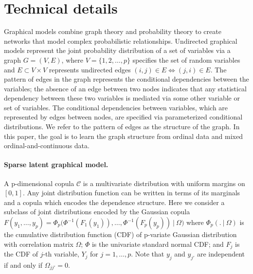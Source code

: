 \section{Technical details}
\label{chpter4:method}
Graphical models combine graph theory and probability theory to create networks that model complex probabilistic relationships. Undirected graphical models represent the joint probability distribution of a set of variables via a graph $G=(V,E)$, where $V = \{1, 2, \ldots, p\}$ specifies the set of random variables and $E \subset V\times V$ represents undirected edges $(i,j) \in E \Leftrightarrow (j,i) \in E$. 
The pattern of edges in the graph represents the conditional dependencies between the variables; the absence of an edge between two nodes indicates that any statistical dependency between these two variables is mediated via some other variable or set of variables. The conditional dependencies between variables, which are represented by edges between nodes, are specified via parameterized conditional distributions. 
We refer to the pattern of edges as the structure of the graph. In this paper, the goal is to learn the graph structure from ordinal data and mixed ordinal-and-continuous data.


\paragraph{Sparse latent graphical model.} A p-dimensional copula $\mathcal{C}$ is a multivariate distribution with uniform margins on $[0, 1]$. Any joint distribution function can be written in terms of its marginals and a copula which encodes the dependence structure. Here we consider a subclass of joint distributions encoded by the Gaussian copula 
$F(y_1, \ldots, y_p) = \Phi_p \Big( \Phi^{-1}(F_1(y_1)), \ldots, \Phi^{-1}(F_p(y_p)) \ | \ \Omega \Big)$
where $\Phi_p(. \ | \ \Omega)$ is the cumulative distribution function (CDF) of p-variate Gaussian distribution with correlation matrix $\Omega$; $\Phi$ is the univariate standard normal CDF; and $F_j$ is the CDF of $j$-th variable, $Y_j$ for $j = 1, \ldots, p$. Note that $y_j$ and $y_{j'}$ are independent if and only if $\Omega_{jj'} = 0$. 

